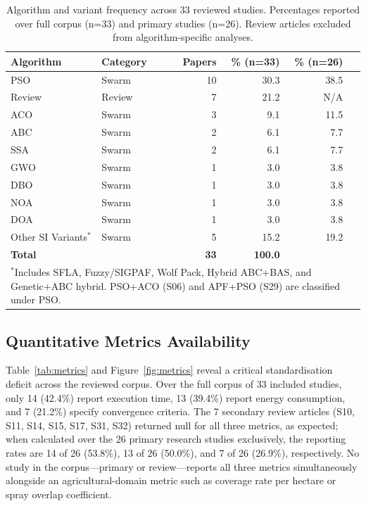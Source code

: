 \documentclass[review,3p,times]{elsarticle}
\begin{document}
\begin{table}[htbp]
\centering
\caption{Algorithm and variant frequency across 33 reviewed studies. Percentages reported over full corpus (n=33) and primary studies (n=26). Review articles excluded from algorithm-specific analyses.}
\label{tab:algorithms}
\begin{tabular}{llrrrr}
\toprule
\textbf{Algorithm} & \textbf{Category} & \textbf{Papers} & \textbf{\% (n=33)} & \textbf{\% (n=26)} \\
\midrule
PSO & Swarm & 10 & 30.3 & 38.5 \\
Review & Review & 7 & 21.2 & N/A \\
ACO & Swarm & 3 & 9.1 & 11.5 \\
ABC & Swarm & 2 & 6.1 & 7.7 \\
SSA & Swarm & 2 & 6.1 & 7.7 \\
GWO & Swarm & 1 & 3.0 & 3.8 \\
DBO & Swarm & 1 & 3.0 & 3.8 \\
NOA & Swarm & 1 & 3.0 & 3.8 \\
DOA & Swarm & 1 & 3.0 & 3.8 \\
Other SI Variants$^*$ & Swarm & 5 & 15.2 & 19.2 \\
\midrule
\textbf{Total} & & \textbf{33} & \textbf{100.0} & \\
\bottomrule
\multicolumn{6}{p{0.92\textwidth}}{\scriptsize$^*$Includes SFLA, Fuzzy/SIGPAF, Wolf Pack, Hybrid ABC+BAS, and Genetic+ABC hybrid. PSO+ACO (S06) and APF+PSO (S29) are classified under PSO.}
\end{tabular}
\end{table}

\subsection{Quantitative Metrics Availability}

Table~\ref{tab:metrics} and Figure~\ref{fig:metrics} reveal a critical standardisation deficit across the reviewed corpus. Over the full corpus of 33 included studies, only 14 (42.4\%) report execution time, 13 (39.4\%) report energy consumption, and 7 (21.2\%) specify convergence criteria. The 7 secondary review articles (S10, S11, S14, S15, S17, S31, S32) returned null for all three metrics, as expected; when calculated over the 26 primary research studies exclusively, the reporting rates are 14 of 26 (53.8\%), 13 of 26 (50.0\%), and 7 of 26 (26.9\%), respectively. No study in the corpus---primary or review---reports all three metrics simultaneously alongside an agricultural-domain metric such as coverage rate per hectare or spray overlap coefficient.
\end{document}
